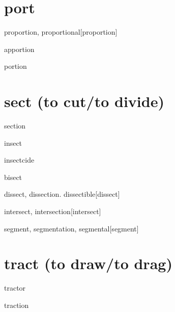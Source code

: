 \section{port}

\begin{RefWord}{proportion, proportional}[proportion]
\end{RefWord}

\begin{RefWord}{apportion}
\end{RefWord}

\begin{RefWord}{portion}
\end{RefWord}

\section{sect (to cut/to divide)}

\begin{RefWord}{section}
\end{RefWord}

\begin{RefWord}{insect}
\end{RefWord}

\begin{RefWord}{insectcide}
\end{RefWord}

\begin{RefWord}{bisect}
\end{RefWord}

\begin{RefWord}{dissect, dissection. dissectible}[dissect]
\end{RefWord}

\begin{RefWord}{intersect, intersection}[intersect]
\end{RefWord}

\begin{RefWord}{segment, segmentation, segmental}[segment]
\end{RefWord}

\section{tract (to draw/to drag)}

\begin{RefWord}{tractor}
\end{RefWord}

\begin{RefWord}{traction}
\end{RefWord}

